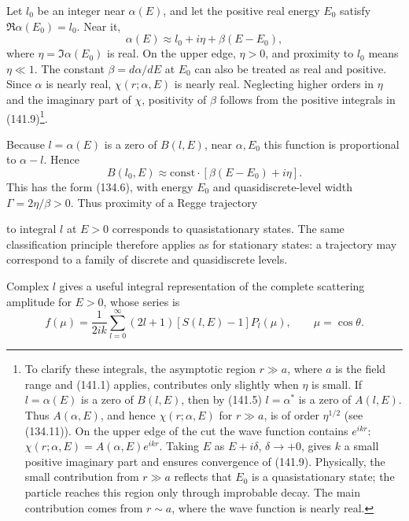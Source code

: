 Let $l_0$ be an integer near $\alpha(E)$, and let the positive real energy $E_0$ satisfy $\Re\alpha(E_0)=l_0$. Near it,
\begin{equation}
 \alpha(E)\approx l_0+i\eta+\beta(E-E_0),
 \tag{141.12}
\end{equation}
where $\eta=\Im\alpha(E_0)$ is real. On the upper edge, $\eta>0$, and proximity to $l_0$ means $\eta\ll1$. The constant $\beta=d\alpha/dE$ at $E_0$ can also be treated as real and positive. Since $\alpha$ is nearly real, $\chi(r;\alpha,E)$ is nearly real. Neglecting higher orders in $\eta$ and the imaginary part of $\chi$, positivity of $\beta$ follows from the positive integrals in (141.9)\footnote{To clarify these integrals, the asymptotic region $r\gg a$, where $a$ is the field range and (141.1) applies, contributes only slightly when $\eta$ is small. If $l=\alpha(E)$ is a zero of $B(l,E)$, then by (141.5) $l=\alpha^*$ is a zero of $A(l,E)$. Thus $A(\alpha,E)$, and hence $\chi(r;\alpha,E)$ for $r\gg a$, is of order $\eta^{1/2}$ (see (134.11)). On the upper edge of the cut the wave function contains $e^{ikr}$: $\chi(r;\alpha,E)=A(\alpha,E)e^{ikr}$. Taking $E$ as $E+i\delta$, $\delta\to+0$, gives $k$ a small positive imaginary part and ensures convergence of (141.9). Physically, the small contribution from $r\gg a$ reflects that $E_0$ is a quasistationary state; the particle reaches this region only through improbable decay. The main contribution comes from $r\sim a$, where the wave function is nearly real.}.

Because $l=\alpha(E)$ is a zero of $B(l,E)$, near $\alpha,E_0$ this function is proportional to $\alpha-l$. Hence
\begin{equation}
 B(l_0,E)\approx\mathrm{const}\cdot[\beta(E-E_0)+i\eta].
 \tag{141.13}
\end{equation}
This has the form (134.6), with energy $E_0$ and quasidiscrete-level width $\Gamma=2\eta/\beta>0$. Thus proximity of a Regge trajectory

to integral $l$ at $E>0$ corresponds to quasistationary states. The same classification principle therefore applies as for stationary states: a trajectory may correspond to a family of discrete and quasidiscrete levels.

Complex $l$ gives a useful integral representation of the complete scattering amplitude for $E>0$, whose series is
\begin{equation}
 f(\mu)=\frac1{2ik}\sum_{l=0}^{\infty}(2l+1)[S(l,E)-1]P_l(\mu),\qquad\mu=\cos\theta.
 \tag{141.14}
\end{equation}

